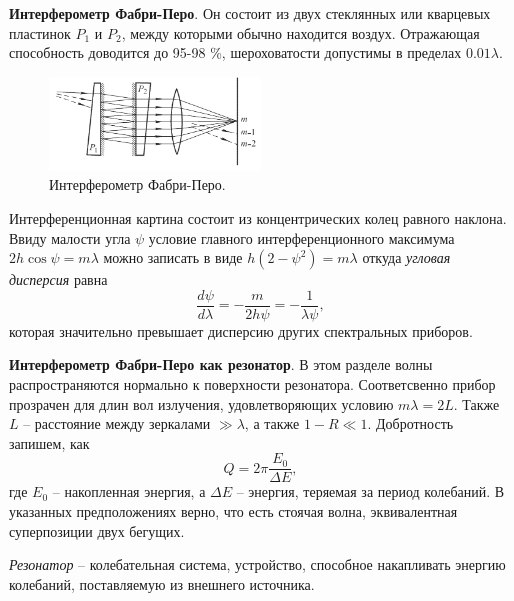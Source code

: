 \textbf{Интерферометр Фабри-Перо}.
Он состоит из двух стеклянных 
или кварцевых пластинок $P_1$ и $P_2$, между которыми обычно находится воздух. Отражающая способность доводится до 95-98 \%, шероховатости допустимы в пределах $0.01 \lambda$. 
\begin{figure}[ht]
    \centering
    \includegraphics[width=0.5\textwidth]{figures/36_2.png}
    \caption{Интерферометр Фабри-Перо.}
    \label{fig:fp}
\end{figure}
Интерференционная картина состоит из концентрических колец равного наклона. Ввиду малости угла $\psi$ условие главного интерференционного максимума $2 h \cos \psi = m \lambda$ можно записать в виде $h(2-\psi^2) = m\lambda$ откуда \textit{угловая дисперсия} равна
\begin{equation*}
    \frac{d \psi}{d \lambda} = - \frac{m}{2 h \psi} = - \frac{1}{\lambda \psi},
\end{equation*}
которая значительно превышает дисперсию других спектральных приборов. 



\textbf{Интерферометр Фабри-Перо как резонатор}.
В этом разделе волны распространяются нормально к поверхности резонатора. Соответсвенно прибор прозрачен для длин вол излучения, удовлетворяющих условию $m \lambda = 2 L$. Также $L$ -- расстояние между зеркалами $\gg \lambda$, а также $1-R \ll 1$. Добротность запишем, как
\begin{equation*}
    Q = 2 \pi \frac{E_0}{\Delta E}, 
\end{equation*}
где $E_0$ -- накопленная энергия, а $\Delta E$ -- энергия, теряемая за период колебаний. 
В указанных предположениях верно, что есть стоячая волна, эквивалентная суперпозиции двух бегущих. 



\begin{to_def}
    \textit{Резонатор} -- колебательная система, устройство, способное накапливать энергию колебаний, поставляемую из внешнего источника. 
\end{to_def}


